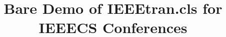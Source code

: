 \documentclass[10pt, a4paper, conference, compsocconf]{IEEEtran}
\begin{document}
%
\title{Bare Demo of IEEEtran.cls for IEEECS Conferences}





% 




\end{document}
